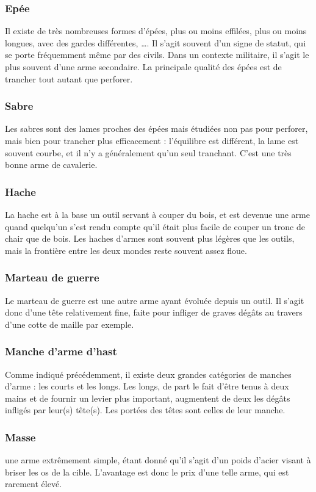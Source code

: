 \documentclass[10pt,a4paper,twocolumn]{book}
\begin{document}
\subsubsection{Epée}
Il existe de très nombreuses formes d’épées, plus ou moins effilées, plus ou moins longues, avec des gardes différentes, …. Il s’agit souvent d’un signe de statut, qui se porte fréquemment même par des civils. Dans un contexte militaire, il s’agit le plus souvent d’une arme secondaire. La principale qualité des épées est de trancher tout autant que perforer.
\subsubsection{Sabre}
Les sabres sont des lames proches des épées mais étudiées non pas pour perforer, mais bien pour trancher plus efficacement : l’équilibre est différent, la lame est souvent courbe, et il n'y a généralement qu'un seul tranchant. C'est une très bonne arme de cavalerie.
\subsubsection{Hache}
La hache est à la base un outil servant à couper du bois, et est devenue une arme quand quelqu’un s’est rendu compte qu’il était plus facile de couper un tronc de chair que de bois. Les haches d’armes sont souvent plus légères que les outils, mais la frontière entre les deux mondes reste souvent assez floue. 
\subsubsection{Marteau de guerre}
Le marteau de guerre est une autre arme ayant évoluée depuis un outil. Il s’agit donc d’une tête relativement fine, faite pour infliger de graves dégâts au travers d’une cotte de maille par exemple.
\subsubsection{Manche d’arme d’hast}
Comme indiqué précédemment, il existe deux grandes catégories de manches d’arme : les courts et les longs. Les longs, de part le fait d’être tenus à deux mains et de fournir un levier plus important, augmentent de deux les dégâts infligés par leur(s) tête(s). Les portées des têtes sont celles de leur manche.
\subsubsection{Masse}
une arme extrêmement simple, étant donné qu’il s’agit d’un poids d’acier visant à briser les os de la cible. L’avantage est donc le prix d’une telle arme, qui est rarement élevé.
\end{document}
